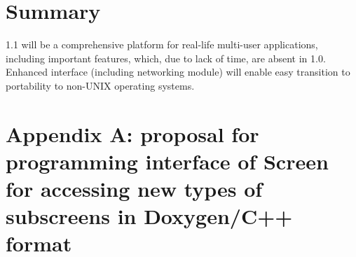 \documentclass[11pt,a4paper]{article}
\begin{document}
\section{Summary}
1.1 will be a comprehensive platform for real-life multi-user applications,
including important features, which, due to lack of time, are absent
in 1.0. Enhanced interface (including networking module) will enable
easy transition to portability to non-UNIX operating systems.

\section*{Appendix A: proposal for programming interface %
of Screen for accessing new types of subscreens in Doxygen/C++ format}
\lstset{commentstyle=\textit,stepnumber=1000 ,keywordstyle=\bfseries,
    showstringspaces=false}
\lstset{numbers=none,numbersep=0.4cm,numberstyle=\tt,tabsize=4,
    basicstyle=\tt\scriptsize,texcl=false}
\lstset{language=C++,breaklines=true}
\end{document}

